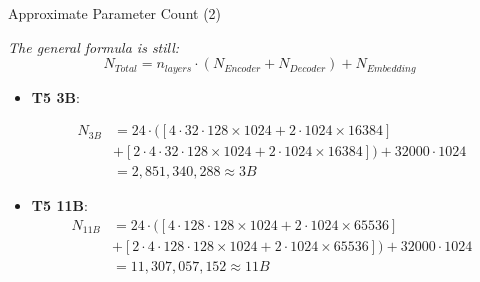 \begin{frame}{Approximate Parameter Count (2)}

\textit{The general formula is still:} $$N_{Total} = n_{layers}\cdot (N_{Encoder} + N_{Decoder}) + N_{Embedding}$$

\begin{itemize}
    \item \textbf{T5 3B}: 

    $$
    \begin{aligned}
        N_{3B} &= 24\cdot ([4\cdot 32\cdot 128 \times 1024 + 2\cdot 1024 \times 16384] \\
        &+ [2\cdot 4 \cdot 32\cdot 128 \times 1024 + 2\cdot 1024 \times 16384]) + 32000\cdot 1024 \\
        &= 2,851,340,288 \approx 3B
    \end{aligned}
    $$

    \hspace{}

    \item \textbf{T5 11B}:
    $$
    \begin{aligned}
        N_{11B} &= 24\cdot ([4\cdot 128\cdot 128 \times 1024 + 2\cdot 1024 \times 65536] \\
        &+ [2\cdot 4 \cdot 128\cdot 128 \times 1024 + 2\cdot 1024 \times 65536]) + 32000\cdot 1024 \\
        &= 11,307,057,152 \approx 11B
    \end{aligned}
    $$
\end{itemize}
    
\end{frame}


\endlecture

